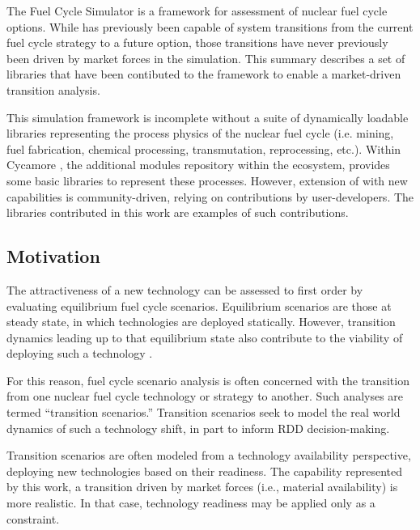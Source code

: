 
The \Cyclus Fuel Cycle Simulator \cite{carlsen_cyclus_2014} is a framework for 
assessment of nuclear fuel cycle options. While \Cyclus has previously been 
capable of system transitions from the current fuel cycle strategy to a future 
option, those transitions have never previously been driven by market forces in 
the simulation.  This summary describes a set of libraries 
\cite{huff_market_2014} that have been contibuted to the \Cyclus framework to 
enable a market-driven transition analysis.

This simulation framework is incomplete without a suite of dynamically loadable 
libraries representing the process physics of the nuclear fuel cycle (i.e.  
mining, fuel fabrication, chemical processing, transmutation, reprocessing, 
etc.).  Within 
Cycamore \cite{carlsen_cycamore_2014}, the additional modules repository within 
the \Cyclus ecosystem, provides some basic 
libraries to represent these processes. However, extension of \Cyclus with new 
capabilities is community-driven, relying on contributions by user-developers. 
The libraries contributed in this work are examples of such contributions.

\subsection{Motivation}

The attractiveness of a new technology can be assessed to first order by 
evaluating equilibrium fuel cycle scenarios. Equilibrium scenarios are those 
at steady state, in which technologies are deployed statically. However, 
transition dynamics leading up to that equilibrium state also contribute to 
the viability of deploying such a technology \cite{piet_dynamic_2011}.  

For this reason, fuel cycle scenario analysis is often concerned with the 
transition from one nuclear fuel cycle technology or strategy to another. Such 
analyses are termed ``transition scenarios.''  Transition scenarios seek to 
model the real world dynamics of such a technology shift, in part to inform 
\gls{RDD} decision-making. 

Transition scenarios are often modeled from a technology availability 
perspective, deploying new technologies based on their readiness.  The 
capability represented by this work, a transition 
driven by market forces (i.e., material availability) is more realistic. In 
that case, technology readiness may be applied only as a constraint. 

